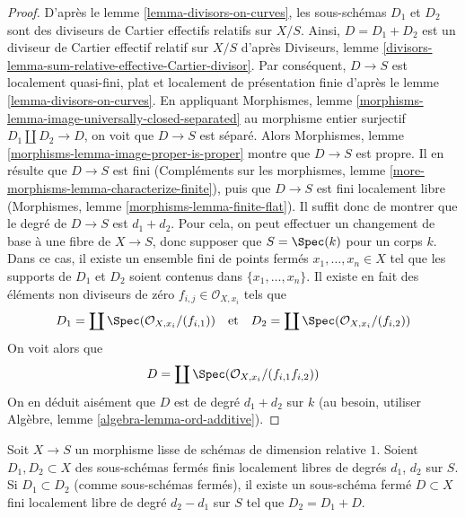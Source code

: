 \begin{proof}
D'après le lemme \ref{lemma-divisors-on-curves}, les sous-schémas $D_1$
et $D_2$ sont des diviseurs de Cartier effectifs relatifs sur $X/S$.
Ainsi, $D = D_1 + D_2$ est un diviseur de Cartier effectif relatif
sur $X/S$ d'après
Diviseurs, lemme \ref{divisors-lemma-sum-relative-effective-Cartier-divisor}.
Par conséquent, $D \to S$ est localement quasi-fini, plat et
localement de présentation finie d'après le
lemme \ref{lemma-divisors-on-curves}.
En appliquant
Morphismes, lemme \ref{morphisms-lemma-image-universally-closed-separated}
au morphisme entier surjectif $D_1 \amalg D_2 \to D$,
on voit que $D \to S$ est séparé. Alors
Morphismes, lemme \ref{morphisms-lemma-image-proper-is-proper}
montre que $D \to S$ est propre.
Il en résulte que $D \to S$ est fini
(Compléments sur les morphismes, lemme \ref{more-morphisms-lemma-characterize-finite}),
puis que $D \to S$ est fini localement libre
(Morphismes, lemme \ref{morphisms-lemma-finite-flat}).
Il suffit donc de montrer que le degré de $D \to S$ est $d_1 + d_2$.
Pour cela, on peut effectuer un changement de base à une fibre de $X \to S$, donc
supposer que $S = \Spec(k)$ pour un corps $k$.
Dans ce cas, il existe un ensemble fini de points fermés
$x_1, \ldots, x_n \in X$ tel que les supports de $D_1$ et $D_2$
soient contenus dans $\{x_1, \ldots, x_n\}$.
Il existe en fait des éléments non diviseurs de zéro $f_{i, j} \in \mathcal{O}_{X, x_i}$
tels que
$$
D_1 = \coprod \Spec(\mathcal{O}_{X, x_i}/(f_{i, 1}))
\quad\text{et}\quad
D_2 = \coprod \Spec(\mathcal{O}_{X, x_i}/(f_{i, 2}))
$$
On voit alors que
$$
D = \coprod \Spec(\mathcal{O}_{X, x_i}/(f_{i, 1}f_{i, 2}))
$$
On en déduit aisément que $D$ est de degré $d_1 + d_2$
sur $k$ (au besoin, utiliser Algèbre, lemme \ref{algebra-lemma-ord-additive}).
\end{proof}

\begin{lemma}
\label{lemma-difference-divisors-on-curves}
Soit $X \to S$ un morphisme lisse de schémas de dimension relative $1$.
Soient $D_1, D_2 \subset X$ des sous-schémas fermés finis localement libres de
degrés $d_1$, $d_2$ sur $S$. Si $D_1 \subset D_2$ (comme sous-schémas fermés),
il existe un sous-schéma fermé $D \subset X$ fini localement libre de
degré $d_2 - d_1$ sur $S$ tel que $D_2 = D_1 + D$.
\end{lemma}

